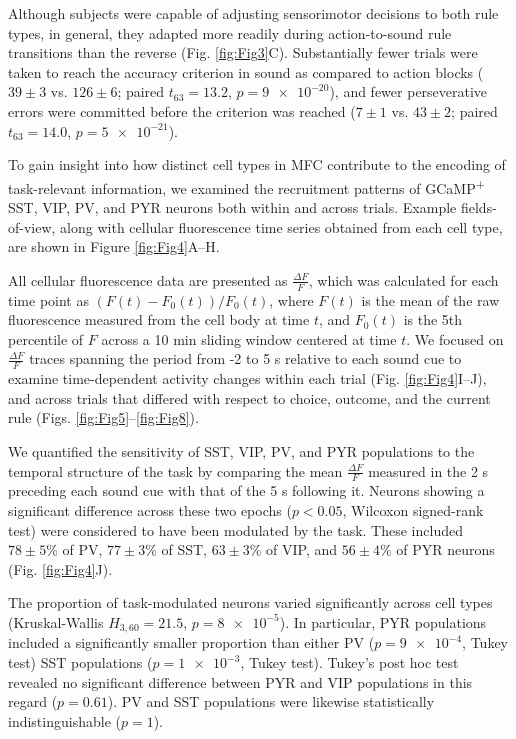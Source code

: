Although subjects were capable of adjusting sensorimotor decisions to both rule types, in general, they adapted more readily during action-to-sound rule transitions than the reverse (Fig. \ref{fig:Fig3}C). Substantially fewer trials were taken to reach the accuracy criterion in sound as compared to action blocks ($39 \pm 3$ vs. $126 \pm 6$; paired $t_{63} =13.2$, $p=\num{9e-20}$), and fewer perseverative errors were committed before the criterion was reached ($7 \pm 1$ vs. $43 \pm 2$; paired $t_{63} =14.0$, $p=\num{5e-21}$).


To gain insight into how distinct cell types in MFC contribute to the encoding of task-relevant information, we examined the recruitment patterns of GCaMP\textsuperscript{+} SST, VIP, PV, and PYR neurons both within and across trials. Example fields-of-view, along with cellular fluorescence time series obtained from each cell type, are shown in Figure \ref{fig:Fig4}A--H. 



All cellular fluorescence data are presented as $\frac{\Delta F}{F}$, which was calculated for each time point as $(F(t)-F_0(t))/F_0(t)$, where $F(t)$ is the mean of the raw fluorescence measured from the cell body at time $t$, and $F_0(t)$ is the 5th percentile of $F$ across a 10 min sliding window centered at time $t$. We focused on $\frac{\Delta F}{F}$ traces spanning the period from -2 to 5 s relative to each sound cue to examine time-dependent activity changes within each trial (Fig. \ref{fig:Fig4}I--J), and across trials that differed with respect to choice, outcome, and the current rule (Figs. \ref{fig:Fig5}--\ref{fig:Fig8}).

We quantified the sensitivity of SST, VIP, PV, and PYR populations to the temporal structure of the task by comparing the mean $\frac{\Delta F}{F}$ measured in the 2 s preceding each sound cue with that of the 5 s following it. Neurons showing a significant difference across these two epochs ($p<0.05$, Wilcoxon signed-rank test) were considered to have been modulated by the task. These included $78 \pm 5\%$ of PV, $77 \pm 3\%$ of SST, $63 \pm 3\%$ of VIP, and $56 \pm 4\%$ of PYR neurons (Fig. \ref{fig:Fig4}J). 

The proportion of task-modulated neurons varied significantly across cell types (Kruskal-Wallis $H_{3,60}=21.5$, $p=\num{8e-5}$). In particular, PYR populations included a significantly smaller proportion than either PV ($p=\num{9e-4}$, Tukey test) SST populations ($p=\num{1e-3}$, Tukey test). Tukey's post hoc test revealed no significant difference between PYR and VIP populations in this regard ($p=0.61$). PV and SST populations were likewise statistically indistinguishable ($p=1$). 

